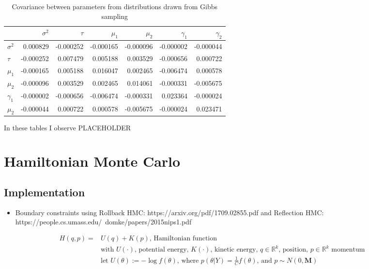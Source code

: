 \documentclass{article}
\begin{document}
\begin{table}[H]
  \begin{center}
    \begin{tabular}{lrrrrrr}
      {} & $\sigma^2$ & $\tau$ & $\mu_1$ & $\mu_2$ & $\gamma_1$ & $\gamma_2$ \\
      \midrule
      $\sigma^2$   &  0.000829 & -0.000252 & -0.000165 & -0.000096 & -0.000002 & -0.000044 \\
      $\tau$  & -0.000252 &  0.007479 &  0.005188 &  0.003529 & -0.000656 &  0.000722 \\
      $\mu_1$  & -0.000165 &  0.005188 &  0.016047 &  0.002465 & -0.006474 &  0.000578 \\
      $\mu_2$  & -0.000096 &  0.003529 &  0.002465 &  0.014061 & -0.000331 & -0.005675 \\
      $\gamma_1$ & -0.000002 & -0.000656 & -0.006474 & -0.000331 &  0.023364 & -0.000024 \\
      $\mu_2$ & -0.000044 &  0.000722 &  0.000578 & -0.005675 & -0.000024 &  0.023471 \\
      \bottomrule
      \end{tabular}
  \end{center}
  \caption{\label{tab:gibbs_covar} Covariance between parameters from distributions drawn from Gibbs sampling}
\end{table}


In these tables I observe PLACEHOLDER




\section{Hamiltonian Monte Carlo}
\subsection*{Implementation}
\begin{itemize}
  \item Boundary constraints using Rollback HMC: https://arxiv.org/pdf/1709.02855.pdf and Reflection HMC: https://people.cs.umass.edu/~domke/papers/2015nips1.pdf
\end{itemize}

\begin{align*}
  H(q, p) =& U(q) + K(p) \textrm{, Hamiltonian function}\\
  & \textrm{with $U(\cdot)$, potential energy, $K(\cdot)$, kinetic energy, $q \in \mathbb{R}^k$, position, $p \in \mathbb{R}^k$ momentum}\\
  & \textrm{let } U(\theta) := -\log f(\theta) \textrm{, where } p(\theta | Y) = \frac{1}{C}f(\theta) \textrm{, and } p \sim N(0, \textbf{M})
\end{align*}
\end{document}
